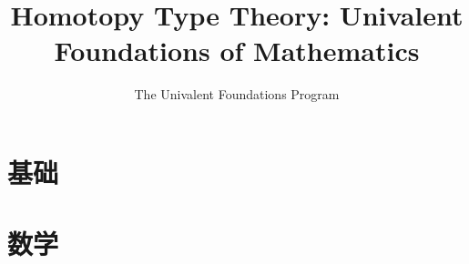 \documentclass[\OPTfontsize]{ctexbook}
\begin{document}
\begin{sloppypar}

\title{Homotopy Type Theory: Univalent Foundations of Mathematics}
\author{The Univalent Foundations Program}


\frontmatter %

\pagestyle{empty}


\cleartooddpage

\hypertarget{preface}{}

\pagestyle{fancyplain}



\cleartooddpage[\thispagestyle{empty}]

\hypertarget{toc}{}

\setcounter{tocdepth}{1}        %
\tableofcontents
\setcounter{tocdepth}{2}        %
\cleartooddpage[\thispagestyle{empty}]

\mainmatter %

\pagestyle{fancyplain}



\part{基础}
\label{part:foundations}















\cleartooddpage[\thispagestyle{empty}] %
\part{数学}
\label{part:mathematics}


\end{sloppypar}
\end{document}
